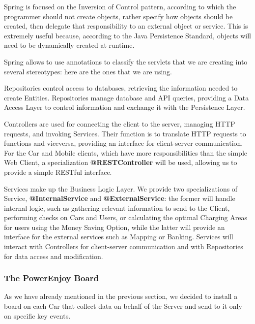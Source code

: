 \documentclass[12pt]{article}
\begin{document}
Spring is focused on the Inversion of Control pattern, according to which the programmer should not create objects, rather specify how objects should be created, then delegate that responsibility to an external object or service. This is extremely useful because, according to the Java Persistence Standard, objects will need to be dynamically created at runtime.

Spring allows to use annotations to classify the servlets that we are creating into several stereotypes: here are the ones that we are using.
\begin{description}[leftmargin=!,labelwidth=\widthof{\bfseries @Repository}]
	\item[@Repository] Repositories control access to databases, retrieving the information needed to create Entities. Repositories manage database and API queries, providing a Data Access Layer to control information and exchange it with the Persistence Layer.
	\item[@Controller] Controllers are used for connecting the client to the server, managing HTTP requests, and invoking Services. Their function is to translate HTTP requests to functions and viceversa, providing an interface for client-server communication. For the Car and Mobile clients, which have more responsibilities than the simple Web Client, a specialization \textbf{@RESTController} will be used, allowing us to provide a simple RESTful interface.
	\item[@Service] Services make up the Business Logic Layer. We provide two specializations of Service, \textbf{@InternalService} and \textbf{@ExternalService}: the former will handle internal logic, such as gathering relevant information to send to the Client, performing checks on Cars and Users, or calculating the optimal Charging Areas for users using the Money Saving Option, while the latter will provide an interface for the external services such as Mapping or Banking. Services will interact with Controllers for client-server communication and with Repositories for data access and modification.
\end{description}

\subsubsection{The PowerEnjoy Board}
As we have already mentioned in the previous section, we decided to install a board on each Car that collect data on behalf of the Server and send to it only on specific key events. 
\end{document}
